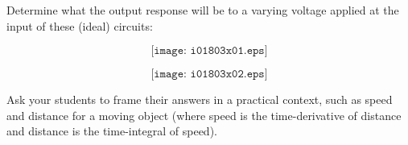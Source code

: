 

Determine what the output response will be to a varying voltage applied at the input of these (ideal) circuits:

$$\texttt{[image: i01803x01.eps]}$$







$$\texttt{[image: i01803x02.eps]}$$







Ask your students to frame their answers in a practical context, such as speed and distance for a moving object (where speed is the time-derivative of distance and distance is the time-integral of speed).




